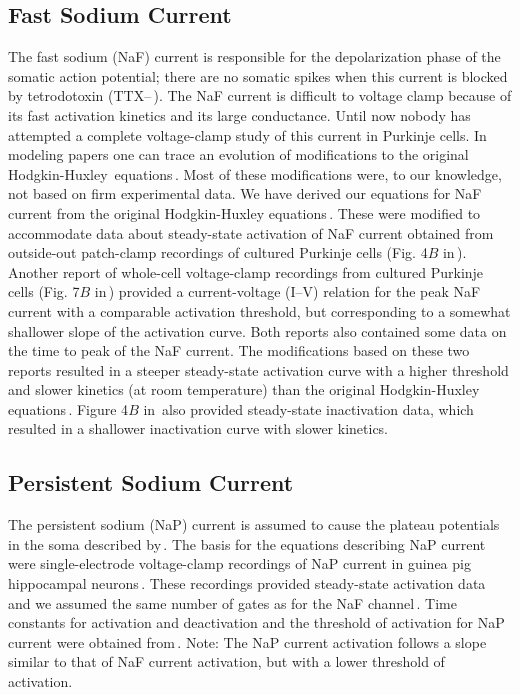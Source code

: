\documentclass[12pt]{article}
\begin{document}
\subsection*{Fast Sodium Current}

The fast sodium (NaF) current is responsible for the depolarization phase of the somatic action potential; there are no somatic spikes when this current is blocked by tetrodotoxin (TTX--\,\cite{R:1980ly}). The NaF current is difficult to voltage clamp because of its fast activation kinetics and its large conductance. Until now nobody has attempted a complete voltage-clamp study of this current in Purkinje cells. In modeling papers one can trace an evolution of modifications to the original Hodgkin-Huxley\,\cite{hodgkin52:_quantitative_description} equations\,\cite{W:1991qa, D:1982lh, Wilson:1989ff}. Most of these modifications were, to our knowledge, not based on firm experimental data. We have derived our equations for NaF current from the original Hodgkin-Huxley equations\,\cite{hodgkin52:_quantitative_description}. These were modified to accommodate data about steady-state activation of NaF current obtained from outside-out patch-clamp recordings of cultured Purkinje cells (Fig. 4$B$ in\,\cite{Gahwiler:1989fk}). Another report of whole-cell voltage-clamp recordings from cultured Purkinje cells (Fig. 7$B$ in\,\cite{Hirano:1989uq}) provided a current-voltage (I--V) relation for the peak NaF current with a comparable activation threshold, but corresponding to a somewhat shallower slope of the activation curve. Both reports also contained some data on the time to peak of the NaF current. The modifications based on these two reports resulted in a steeper steady-state activation curve with a higher threshold and slower kinetics (at room temperature) than the original Hodgkin-Huxley equations\,\cite{hodgkin52:_quantitative_description}. Figure 4$B$ in\,\cite{Gahwiler:1989fk} also provided steady-state inactivation data, which resulted in a shallower inactivation curve with slower kinetics.

\subsection*{Persistent Sodium Current}
The persistent sodium (NaP) current is assumed to cause the plateau potentials in the soma described by\,\cite{R:1980ly}. The basis for the equations describing NaP current were single-electrode voltage-clamp recordings of NaP current in guinea pig hippocampal neurons\,\cite{C-R-French:1990uq}. These recordings provided steady-state activation data and we assumed the same number of gates as for the NaF channel\,\cite{hodgkin52:_quantitative_description}. Time constants for activation and deactivation and the threshold of activation for NaP current were obtained from\,\cite{Kay:1990kx}. Note: The NaP current activation follows a slope similar to that of NaF current activation, but with a lower threshold of activation.



\end{document}
